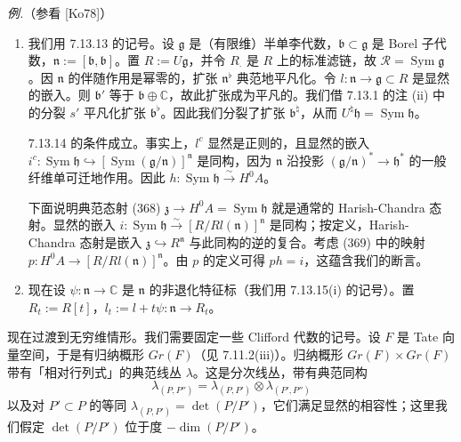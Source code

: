  \emph{例.}（参看 [Ko78]）
\begin{enumerate}[label=(\roman*),leftmargin=2.2em]
\item 我们用 7.13.13 的记号。设 $\mathfrak{g}$ 是（有限维）半单李代数，$\mathfrak{b}\subset\mathfrak{g}$ 是 Borel 子代数，$\mathfrak{n}:=[\mathfrak{b},\mathfrak{b}]$。置 $R:=U\mathfrak{g}$，并令 $R_{\cdot}$ 是 $R$ 上的标准滤链，故 $\mathcal{R}=\operatorname{Sym}\mathfrak{g}$。因 $\mathfrak{n}$ 的伴随作用是幂零的，扩张 $\mathfrak{n}^{\flat}$ 典范地平凡化。令 $l:\mathfrak{n}\to\mathfrak{g}\subset R$ 是显然的嵌入。则 $\mathfrak{b}'$ 等于 $\mathfrak{b}\oplus\mathbb{C}$，故此扩张成为平凡的。我们借 7.13.1 的注 (ii) 中的分裂 $s'$ 平凡化扩张 $\mathfrak{b}^{\flat}$。因此我们分裂了扩张 $\mathfrak{b}^{\natural}$，从而 $U^{\natural}\mathfrak{h}=\operatorname{Sym}\mathfrak{h}$。

7.13.14 的条件成立。事实上，$l^{c}$ 显然是正则的，且显然的嵌入 $i^{c}:\operatorname{Sym}\mathfrak{h}\hookrightarrow[\operatorname{Sym}(\mathfrak{g}/\mathfrak{n})]^{\mathfrak{n}}$ 是同构，因为 $\mathfrak{n}$ 沿投影 $(\mathfrak{g}/\mathfrak{n})^{*}\to\mathfrak{h}^{*}$ 的一般纤维单可迁地作用。因此 $h:\operatorname{Sym}\mathfrak{h}\xrightarrow{\sim}H^{0}A$。

下面说明典范态射 (368) $\mathfrak{z}\to H^{0}A=\operatorname{Sym}\mathfrak{h}$ 就是通常的 Harish-Chandra 态射。显然的嵌入 $i:\operatorname{Sym}\mathfrak{h}\xrightarrow{\sim}[R/Rl(\mathfrak{n})]^{\mathfrak{n}}$ 是同构；按定义，Harish-Chandra 态射是嵌入 $\mathfrak{z}\hookrightarrow R^{\mathfrak{n}}$ 与此同构的逆的复合。考虑 (369) 中的映射 $p:H^{0}A\to[R/Rl(\mathfrak{n})]^{\mathfrak{n}}$。由 $p$ 的定义可得 $ph=i$，这蕴含我们的断言。


\item 现在设 $\psi:\mathfrak{n}\to\mathbb{C}$ 是 $\mathfrak{n}$ 的非退化特征标（我们用 7.13.15(i) 的记号）。置 $R_t:=R[t]$，$l_t:=l+t\psi:\mathfrak{n}\to R_t$。
\end{enumerate}

 现在过渡到无穷维情形。我们需要固定一些 Clifford 代数的记号。设 $F$ 是 Tate 向量空间，于是有归纳概形 $Gr(F)$（见 7.11.2(iii)）。归纳概形 $Gr(F)\times Gr(F)$ 带有「相对行列式」的典范线丛 $\lambda$。这是分次线丛，带有典范同构
\begin{equation}\tag{371}
\lambda_{(P,P'')}=\lambda_{(P,P')}\otimes\lambda_{(P',P'')}
\end{equation}
以及对 $P'\subset P$ 的等同 $\lambda_{(P,P')}=\det(P/P')$，它们满足显然的相容性；这里我们假定 $\det(P/P')$ 位于度 $-\dim(P/P')$。

